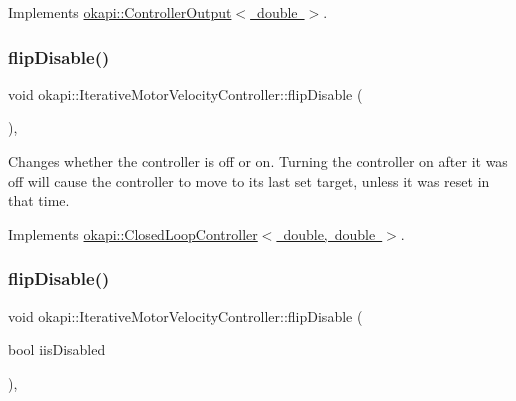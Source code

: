 Implements \mbox{\hyperlink{classokapi_1_1ControllerOutput_a360c08f0c10b36f882d6d3100c2cad49}{okapi\+::\+Controller\+Output$<$ double $>$}}.

\mbox{\label{classokapi_1_1IterativeMotorVelocityController_a24d2200fe82b8f454839caaa511483f6}} 
\subsubsection{\texorpdfstring{flipDisable()}{flipDisable()}\hspace{0.1cm}{\footnotesize\ttfamily [1/2]}}
{\footnotesize\ttfamily void okapi\+::\+Iterative\+Motor\+Velocity\+Controller\+::flip\+Disable (\begin{DoxyParamCaption}{ }\end{DoxyParamCaption})\hspace{0.3cm}{\ttfamily [override]}, {\ttfamily [virtual]}}

Changes whether the controller is off or on. Turning the controller on after it was off will cause the controller to move to its last set target, unless it was reset in that time. 

Implements \mbox{\hyperlink{classokapi_1_1ClosedLoopController_a9de69b60885df41cd2164fe1a23f34d3}{okapi\+::\+Closed\+Loop\+Controller$<$ double, double $>$}}.

\mbox{\label{classokapi_1_1IterativeMotorVelocityController_a8419fd62ca804f0446204b59ce37d01c}} 
\subsubsection{\texorpdfstring{flipDisable()}{flipDisable()}\hspace{0.1cm}{\footnotesize\ttfamily [2/2]}}
{\footnotesize\ttfamily void okapi\+::\+Iterative\+Motor\+Velocity\+Controller\+::flip\+Disable (\begin{DoxyParamCaption}\item[{bool}]{iis\+Disabled }\end{DoxyParamCaption})\hspace{0.3cm}{\ttfamily [override]}, {\ttfamily [virtual]}}

